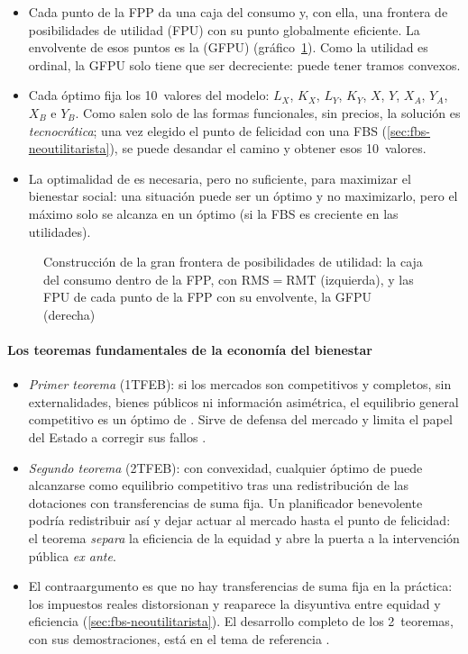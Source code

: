 \documentclass[11pt]{article}
\begin{document}
\begin{itemize}
\item Cada punto de la FPP da una caja del consumo y, con ella, una frontera de posibilidades de utilidad (FPU) con su punto globalmente eficiente. La envolvente de esos puntos es la  (GFPU) (gráfico~\ref{fig:gfpu}). Como la utilidad es ordinal, la GFPU solo tiene que ser decreciente: puede tener tramos convexos.
\item Cada óptimo fija los 10~valores del modelo: $L_X$, $K_X$, $L_Y$, $K_Y$, $X$, $Y$, $X_A$, $Y_A$, $X_B$ e $Y_B$. Como salen solo de las formas funcionales, sin precios, la solución es \emph{tecnocrática}; una vez elegido el punto de felicidad con una FBS (\ref{sec:fbs-neoutilitarista}), se puede desandar el camino y obtener esos 10~valores.
\item La optimalidad de  es necesaria, pero no suficiente, para maximizar el bienestar social: una situación puede ser un óptimo y no maximizarlo, pero el máximo solo se alcanza en un óptimo (si la FBS es creciente en las utilidades).
\end{itemize}

\begin{figure}[H]
\centering
\caption{Construcción de la gran frontera de posibilidades de utilidad: la caja del consumo dentro de la FPP, con $\mathrm{RMS}=\mathrm{RMT}$ (izquierda), y las FPU de cada punto de la FPP con su envolvente, la GFPU (derecha)}\label{fig:gfpu}
\end{figure}

\paragraph{Los teoremas fundamentales de la economía del bienestar}

\begin{itemize}
\item \emph{Primer teorema} (1TFEB): si los mercados son competitivos y completos, sin externalidades, bienes públicos ni información asimétrica, el equilibrio general competitivo es un óptimo de . Sirve de defensa del mercado y limita el papel del Estado a corregir sus fallos .
\item \emph{Segundo teorema} (2TFEB): con convexidad, cualquier óptimo de  puede alcanzarse como equilibrio competitivo tras una redistribución de las dotaciones con transferencias de suma fija. Un planificador benevolente podría redistribuir así y dejar actuar al mercado hasta el punto de felicidad: el teorema \emph{separa} la eficiencia de la equidad y abre la puerta a la intervención pública \emph{ex ante}.
\item El contraargumento es que no hay transferencias de suma fija en la práctica: los impuestos reales distorsionan y reaparece la disyuntiva entre equidad y eficiencia (\ref{sec:fbs-neoutilitarista}). El desarrollo completo de los 2~teoremas, con sus demostraciones, está en el tema de referencia .
\end{itemize}
\end{document}
